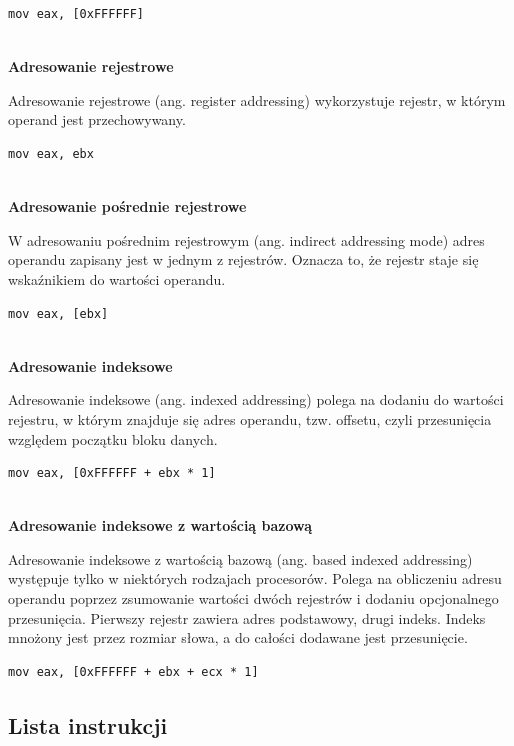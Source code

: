 \documentclass[a4paper,12pt,twoside]{article}
\begin{document}
\begin{lstlisting}[numbers=none, xleftmargin=0]
mov eax, [0xFFFFFF]
\end{lstlisting}
\\
\textbf{Adresowanie rejestrowe}

Adresowanie rejestrowe (ang. register addressing) wykorzystuje rejestr, w którym operand jest przechowywany.

\begin{lstlisting}[numbers=none, xleftmargin=0]
mov eax, ebx
\end{lstlisting}
\\
\textbf{Adresowanie pośrednie rejestrowe}

W adresowaniu pośrednim rejestrowym (ang. indirect addressing mode) adres operandu zapisany jest w jednym z rejestrów. Oznacza to, że rejestr staje się wskaźnikiem do wartości operandu.

\begin{lstlisting}[numbers=none, xleftmargin=0]
mov eax, [ebx]
\end{lstlisting}
\pagebreak
\\
\textbf{Adresowanie indeksowe}

Adresowanie indeksowe (ang. indexed addressing) polega na dodaniu do wartości rejestru, w którym znajduje się adres operandu, tzw. offsetu, czyli przesunięcia względem początku bloku danych.

\begin{lstlisting}[numbers=none, xleftmargin=0]
mov eax, [0xFFFFFF + ebx * 1]
\end{lstlisting}
\\
\textbf{Adresowanie indeksowe z wartością bazową}

Adresowanie indeksowe z wartością bazową (ang. based indexed addressing) występuje tylko w niektórych rodzajach procesorów. Polega na obliczeniu adresu operandu poprzez zsumowanie wartości dwóch rejestrów i dodaniu opcjonalnego przesunięcia. Pierwszy rejestr zawiera adres podstawowy, drugi indeks. Indeks mnożony jest przez rozmiar słowa, a do całości dodawane jest przesunięcie.

\begin{lstlisting}[numbers=none, xleftmargin=0]
mov eax, [0xFFFFFF + ebx + ecx * 1]
\end{lstlisting}

\subsection{Lista instrukcji}
\end{document}
